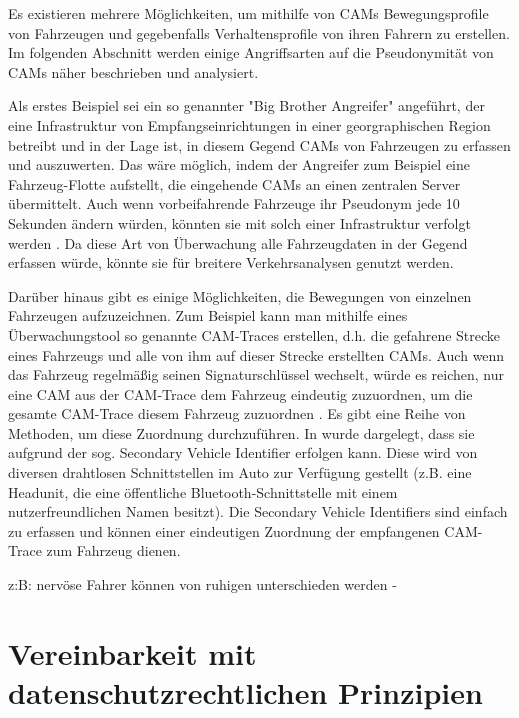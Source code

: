 Es existieren mehrere Möglichkeiten, um mithilfe von CAMs Bewegungsprofile von Fahrzeugen und gegebenfalls Verhaltensprofile von ihren Fahrern zu erstellen. Im folgenden Abschnitt werden einige Angriffsarten auf die Pseudonymität von CAMs näher beschrieben und analysiert. 

Als erstes Beispiel sei ein so genannter "Big Brother Angreifer" angeführt, der eine Infrastruktur von Empfangseinrichtungen in einer georgraphischen Region betreibt und in der Lage ist, in diesem Gegend CAMs von Fahrzeugen zu erfassen und auszuwerten. Das wäre möglich, indem der Angreifer zum Beispiel eine Fahrzeug-Flotte aufstellt, die eingehende CAMs an einen zentralen Server übermittelt. Auch wenn vorbeifahrende Fahrzeuge ihr Pseudonym jede 10 Sekunden ändern würden, könnten sie mit solch einer Infrastruktur verfolgt werden \cite{Wiedersheim2010}. Da diese Art von Überwachung alle Fahrzeugdaten in der Gegend erfassen würde, könnte sie für breitere Verkehrsanalysen genutzt werden.
 
Darüber hinaus gibt es einige Möglichkeiten, die Bewegungen von einzelnen Fahrzeugen aufzuzeichnen. Zum Beispiel kann man mithilfe eines Überwachungstool so genannte CAM-Traces erstellen, d.h. die gefahrene Strecke eines Fahrzeugs und alle von ihm auf dieser Strecke erstellten CAMs. Auch wenn das Fahrzeug regelmäßig seinen Signaturschlüssel wechselt, würde es reichen, nur eine CAM aus der CAM-Trace dem Fahrzeug eindeutig zuzuordnen, um die gesamte CAM-Trace diesem Fahrzeug zuzuordnen \cite{Kiometzis2017}. Es gibt eine Reihe von Methoden, um diese Zuordnung durchzuführen. In \cite{Ullmann2016} wurde dargelegt, dass sie aufgrund der sog. Secondary Vehicle Identifier erfolgen kann. Diese wird von diversen drahtlosen Schnittstellen im Auto zur Verfügung gestellt (z.B. eine Headunit, die eine öffentliche Bluetooth-Schnittstelle mit einem nutzerfreundlichen Namen besitzt). Die Secondary Vehicle Identifiers sind einfach zu erfassen und können einer eindeutigen Zuordnung der empfangenen CAM-Trace zum Fahrzeug dienen. 



z:B: nervöse Fahrer können von ruhigen unterschieden werden - \cite{Dettki2005}













\section{Vereinbarkeit mit datenschutzrechtlichen Prinzipien}
\label{ch:SecondContentSection}

